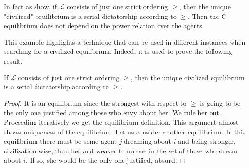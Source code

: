 
    



\color{black}{A language truly brings civilization to a jungle if it has more than one criterion.}\color{black}{} In fact as \cite[RY]{RY} show, if $\mathcal{L}$ consists of just one strict ordering $\geq$, then the unique "civilized" equilibrium is a serial dictatorship according to $\geq$. Then the C equilibrium does not depend on the power relation over the agents\color{black}{ and the civilized jungle is just a normal jungle with another power relation.}  \color{black} 

This example highlights a technique that can be used in different instances when searching for a civilized equilibrium. Indeed, it is used to prove the following result.

\begin{proposition}\label{prop: strict ordering}
    If $\mathcal{L}$ consists of just one strict ordering $\geq$, then the unique civilized equilibrium is a serial dictatorship according to $\geq$.
    \begin{proof}
        It is an equilibrium since the strongest with respect to $\geq$ is going to be the only one justified among those who envy about her. We rule her out. Proceeding iteratively we get the equilibrium definition. This argument almost shows uniqueness of the equilibrium. Let us consider another equilibrium. In this equilibrium there must be some agent $j$ dreaming about $i$ and being stronger, civilization wise, than her and weaker to no one in the set of those who dream about $i$. If so, she would be the only one justified, absurd.
    \end{proof}
\end{proposition}

